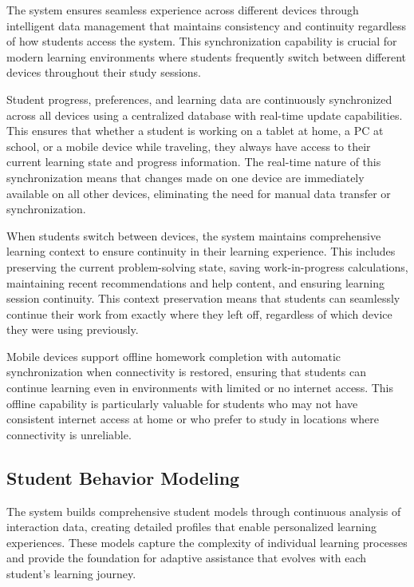 \documentclass[conference]{IEEEtran}
\begin{document}
The system ensures seamless experience across different devices through intelligent data management that maintains consistency and continuity regardless of how students access the system. This synchronization capability is crucial for modern learning environments where students frequently switch between different devices throughout their study sessions.

Student progress, preferences, and learning data are continuously synchronized across all devices using a centralized database with real-time update capabilities. This ensures that whether a student is working on a tablet at home, a PC at school, or a mobile device while traveling, they always have access to their current learning state and progress information. The real-time nature of this synchronization means that changes made on one device are immediately available on all other devices, eliminating the need for manual data transfer or synchronization.

When students switch between devices, the system maintains comprehensive learning context to ensure continuity in their learning experience. This includes preserving the current problem-solving state, saving work-in-progress calculations, maintaining recent recommendations and help content, and ensuring learning session continuity. This context preservation means that students can seamlessly continue their work from exactly where they left off, regardless of which device they were using previously.

Mobile devices support offline homework completion with automatic synchronization when connectivity is restored, ensuring that students can continue learning even in environments with limited or no internet access. This offline capability is particularly valuable for students who may not have consistent internet access at home or who prefer to study in locations where connectivity is unreliable.

\subsection{Student Behavior Modeling}

The system builds comprehensive student models through continuous analysis of interaction data, creating detailed profiles that enable personalized learning experiences. These models capture the complexity of individual learning processes and provide the foundation for adaptive assistance that evolves with each student's learning journey.
\end{document}
